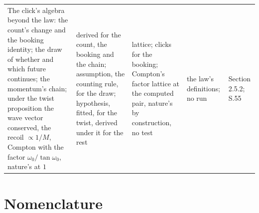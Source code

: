 \documentclass[pdflatex,sn-mathphys-num]{sn-jnl}
\theoremstyle{thmstyleone}
\begin{document}
\begin{footnotesize}
\begin{longtable}{L{4.3cm}L{2.4cm}L{1.2cm}L{2.0cm}L{2.0cm}}
The click's algebra beyond the law: the count's change and the booking identity; the draw of whether and which future continues; the momentum's chain; under the twist proposition the wave vector conserved, the recoil $\propto 1 / M$, Compton with the factor $\omega_0 / \tan\omega_0$, nature's at $1$ & derived for the count, the booking and the chain; assumption, the counting rule, for the draw; hypothesis, fitted, for the twist, derived under it for the rest & lattice; clicks for the booking; Compton's factor lattice at the computed pair, nature's by construction, no test & the law's definitions; no run & Section 2.5.2; S.55\\
\end{longtable}\end{footnotesize}

\section*{Nomenclature}
\end{document}
